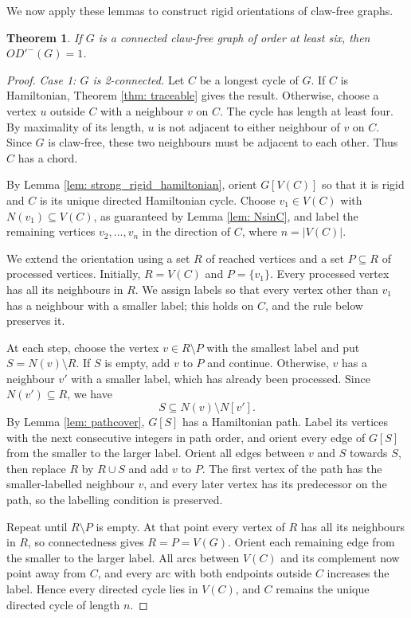 \documentclass[a4paper,12pt]{elsarticle}
\newtheorem{theorem}{Theorem}
\begin{document}
We now apply these lemmas to construct rigid orientations of claw-free graphs.

\begin{theorem}
If $G$ is a connected claw-free graph of order at least six, then $OD'^-(G)=1$.
\end{theorem}
\begin{proof}
\emph{Case 1: $G$ is 2-connected.}
Let $C$ be a longest cycle of $G$. If $C$ is Hamiltonian, Theorem \ref{thm: traceable} gives the result. Otherwise, choose a vertex $u$ outside $C$ with a neighbour $v$ on $C$. The cycle has length at least four. By maximality of its length, $u$ is not adjacent to either neighbour of $v$ on $C$. Since $G$ is claw-free, these two neighbours must be adjacent to each other. Thus $C$ has a chord.

By Lemma \ref{lem: strong_rigid_hamiltonian}, orient $G[V(C)]$ so that it is rigid and $C$ is its unique directed Hamiltonian cycle. Choose $v_1\in V(C)$ with $N(v_1)\subseteq V(C)$, as guaranteed by Lemma \ref{lem: NsinC}, and label the remaining vertices $v_2,\ldots,v_n$ in the direction of $C$, where $n=|V(C)|$.

We extend the orientation using a set $R$ of reached vertices and a set $P\subseteq R$ of processed vertices. Initially, $R=V(C)$ and $P=\{v_1\}$. Every processed vertex has all its neighbours in $R$. We assign labels so that every vertex other than $v_1$ has a neighbour with a smaller label; this holds on $C$, and the rule below preserves it.

At each step, choose the vertex $v\in R\setminus P$ with the smallest label and put $S=N(v)\setminus R$. If $S$ is empty, add $v$ to $P$ and continue. Otherwise, $v$ has a neighbour $v'$ with a smaller label, which has already been processed. Since $N(v')\subseteq R$, we have
\[
S\subseteq N(v)\setminus N[v'].
\]
By Lemma \ref{lem: pathcover}, $G[S]$ has a Hamiltonian path. Label its vertices with the next consecutive integers in path order, and orient every edge of $G[S]$ from the smaller to the larger label. Orient all edges between $v$ and $S$ towards $S$, then replace $R$ by $R\cup S$ and add $v$ to $P$. The first vertex of the path has the smaller-labelled neighbour $v$, and every later vertex has its predecessor on the path, so the labelling condition is preserved.

Repeat until $R\setminus P$ is empty. At that point every vertex of $R$ has all its neighbours in $R$, so connectedness gives $R=P=V(G)$. Orient each remaining edge from the smaller to the larger label. All arcs between $V(C)$ and its complement now point away from $C$, and every arc with both endpoints outside $C$ increases the label. Hence every directed cycle lies in $V(C)$, and $C$ remains the unique directed cycle of length $n$.


\end{proof}
\end{document}
